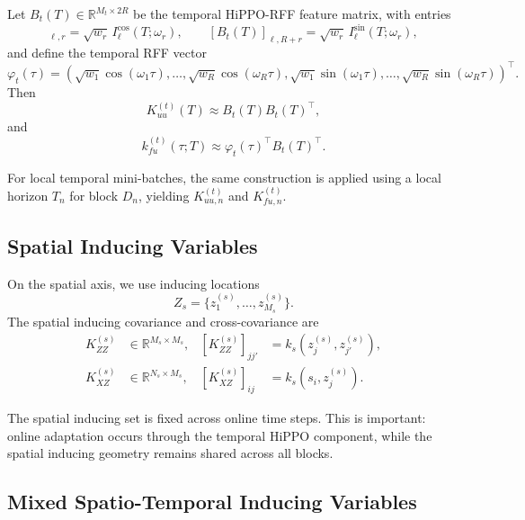 \documentclass[12pt]{article}
\begin{document}
Let $B_t(T)\in\mathbb{R}^{M_t\times 2R}$ be the temporal HiPPO-RFF feature matrix,
with entries
\begin{equation}
[B_t(T)]_{\ell,r}
=
\sqrt{w_r}\,I^{\cos}_\ell(T;\omega_r),
\qquad
[B_t(T)]_{\ell,R+r}
=
\sqrt{w_r}\,I^{\sin}_\ell(T;\omega_r),
\end{equation}
and define the temporal RFF vector
\begin{equation}
\varphi_t(\tau)
=
\left(
\sqrt{w_1}\cos(\omega_1\tau),\dots,\sqrt{w_R}\cos(\omega_R\tau),
\sqrt{w_1}\sin(\omega_1\tau),\dots,\sqrt{w_R}\sin(\omega_R\tau)
\right)^\top.
\end{equation}
Then
\begin{equation}
K_{uu}^{(t)}(T)
\approx
B_t(T)B_t(T)^\top,
\label{eq:temporal-inducing-cov}
\end{equation}
and
\begin{equation}
k_{fu}^{(t)}(\tau;T)
\approx
\varphi_t(\tau)^\top B_t(T)^\top.
\label{eq:temporal-cross-cov}
\end{equation}

For local temporal mini-batches, the same construction is applied using a local horizon
$T_n$ for block $D_n$, yielding $K_{uu,n}^{(t)}$ and $K_{fu,n}^{(t)}$.

\subsection{Spatial Inducing Variables}

On the spatial axis, we use inducing locations
\begin{equation}
Z_s=\{z_1^{(s)},\dots,z_{M_s}^{(s)}\}.
\end{equation}
The spatial inducing covariance and cross-covariance are
\begin{align}
K_{ZZ}^{(s)}
&\in\mathbb{R}^{M_s\times M_s},
&
[K_{ZZ}^{(s)}]_{jj'}
&=
k_s(z_j^{(s)},z_{j'}^{(s)}),
\\
K_{XZ}^{(s)}
&\in\mathbb{R}^{N_s\times M_s},
&
[K_{XZ}^{(s)}]_{ij}
&=
k_s(s_i,z_j^{(s)}).
\end{align}

The spatial inducing set is fixed across online time steps. This is important: online
adaptation occurs through the temporal HiPPO component, while the spatial inducing
geometry remains shared across all blocks.

\subsection{Mixed Spatio-Temporal Inducing Variables}
\end{document}
